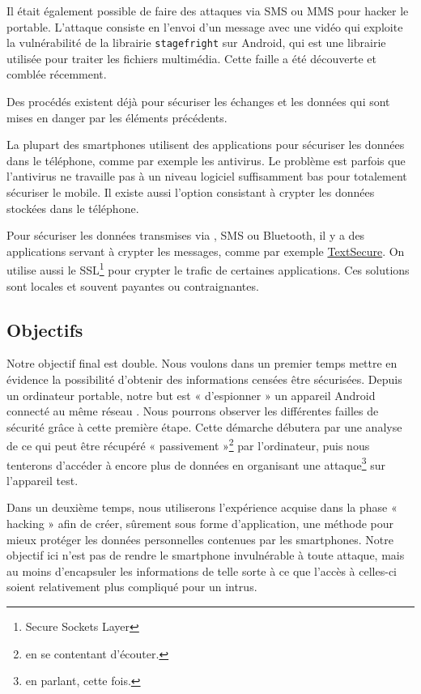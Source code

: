 \documentclass[a4paper, 12pt,twoside]{article}
\begin{document}
	Il était également possible de faire des attaques via SMS ou MMS pour hacker le portable. L'attaque consiste en l'envoi d'un message avec une vidéo qui exploite la vulnérabilité de la librairie \verb!stagefright! sur \newcommand{\Android}{Android} \Android{}, qui est une librairie utilisée pour traiter les fichiers multimédia. Cette faille a été découverte et comblée récemment.

	Des procédés existent déjà pour sécuriser les échanges et les données qui sont mises en danger par les éléments précédents.
	
	La plupart des smartphones utilisent des applications pour sécuriser les données dans le téléphone, comme par exemple les antivirus. Le problème est parfois que l'antivirus ne travaille pas à un niveau logiciel suffisamment bas pour totalement sécuriser le mobile. Il existe aussi l'option consistant à crypter les données stockées dans le téléphone.
	
	Pour sécuriser les données transmises via \wifi{}, SMS ou\newcommand{\bluetooth}{Bluetooth} \bluetooth{}, il y a des applications servant à crypter les messages, comme par exemple \href{http://www.whispersystems.org/#encrypted_texts}{TextSecure}. On utilise aussi le SSL\footnote{Secure Sockets Layer} pour crypter le trafic de certaines applications. Ces solutions sont locales et souvent payantes ou contraignantes.

	\subsection{Objectifs}
	
	Notre objectif final est double. Nous voulons dans un premier temps mettre en évidence la possibilité d'obtenir des informations censées être sécurisées. Depuis un ordinateur portable, notre but est « d'espionner » un appareil \Android{} connecté au même réseau \wifi{}. Nous pourrons observer les différentes failles de sécurité grâce à cette première étape. Cette démarche débutera par une analyse de ce qui peut être récupéré « passivement »\footnote{en se contentant d'écouter.} par l'ordinateur, puis nous tenterons d'accéder à encore plus de données en organisant une attaque\footnote{en parlant, cette fois.} sur l'appareil test.
		
	Dans un deuxième temps, nous utiliserons l'expérience acquise dans la phase « hacking » afin de créer, sûrement sous forme d'application, une méthode pour mieux protéger les données personnelles contenues par les smartphones. Notre objectif ici n'est pas de rendre le smartphone invulnérable à toute attaque, mais au moins d'encapsuler les informations de telle sorte à ce que l'accès à celles-ci soient relativement plus compliqué pour un intrus.
\end{document}
